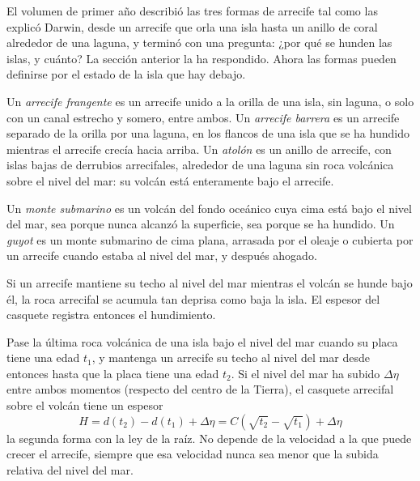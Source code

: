 El volumen de primer año describió las tres formas de arrecife tal como las explicó Darwin, desde un arrecife que orla
una isla hasta un anillo de coral alrededor de una laguna, y terminó con una pregunta: ¿por qué se hunden las islas,
y cuánto? La sección anterior la ha respondido. Ahora las formas pueden definirse por el estado de la
isla que hay debajo.

\begin{definition}\label{def:b2:oceanic-islands:reefs}
Un \emph{arrecife frangente} es un arrecife unido a la orilla de una isla, sin
laguna, o solo con un canal estrecho y somero, entre ambos. Un \emph{arrecife barrera}
es un arrecife separado de la orilla por una laguna, en los flancos de una isla que se ha hundido mientras el
arrecife crecía hacia arriba. Un \emph{atolón} es un anillo de arrecife, con islas bajas de derrubios arrecifales,
alrededor de una laguna sin roca volcánica sobre el nivel del mar: su volcán está enteramente bajo el arrecife.
\end{definition}

\begin{definition}\label{def:b2:oceanic-islands:seamount}
Un \emph{monte submarino} es un volcán del fondo oceánico cuya cima está bajo el nivel
del mar, sea porque nunca alcanzó la superficie, sea porque se ha hundido. Un
\emph{guyot} es un monte submarino de cima plana, arrasada por el oleaje o cubierta por un arrecife cuando
estaba al nivel del mar, y después ahogado.
\end{definition}

Si un arrecife mantiene su techo al nivel del mar mientras el volcán se hunde bajo él, la roca arrecifal se acumula tan
deprisa como baja la isla. El espesor del casquete registra entonces el hundimiento.

\begin{proposition}\label{prop:b2:oceanic-islands:cap}
Pase la última roca volcánica de una isla bajo el nivel del mar cuando su placa tiene una edad $t_1$, y mantenga un
arrecife su techo al nivel del mar desde entonces hasta que la placa tiene una edad $t_2$. Si el nivel del mar ha subido
$\Delta\eta$ entre ambos momentos (respecto del centro de la Tierra), el casquete arrecifal
sobre el volcán tiene un espesor
\[
H = d(t_2) - d(t_1) + \Delta\eta = C\left(\sqrt{t_2} - \sqrt{t_1}\right) + \Delta\eta
\]
la segunda forma con la ley de la raíz. No depende de la velocidad a la que puede crecer el arrecife,
siempre que esa velocidad nunca sea menor que la subida relativa del nivel del mar.
\end{proposition}

